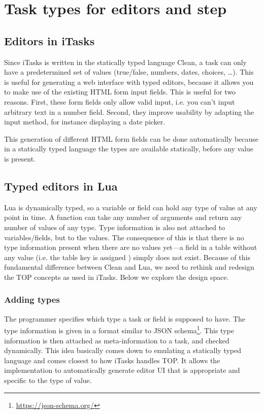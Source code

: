 \section{Task types for editors and step}\label{section-types-editors-step}


\subsection{Editors in iTasks}
Since iTasks is written in the statically typed language Clean, a task can only have a predetermined set of values (true/false, numbers, dates, choices, \dots). This is useful for generating a web interface with typed editors, because it allows you to make use of the existing HTML form input fields. This is useful for two reasons. First, these form fields only allow valid input, i.e. you can't input arbitrary text in a number field. Second, they improve usability by adapting the input method, for instance displaying a date picker.

This generation of different HTML form fields can be done automatically because in a statically typed language the types are available statically, before any value is present.

\subsection{Typed editors in Lua}\label{section-editors-lua}
Lua is dynamically typed, so a variable or field can hold any type of value at any point in time. A function can take any number of arguments and return any number of values of any type. Type information is also not attached to variables/fields, but to the values. The consequence of this is that there is no type information present when there are no values yet---a field in a table without any value (i.e. the table key is assigned ) simply does not exist.
Because of this fundamental difference between Clean and Lua, we need to rethink and redesign the TOP concepts as used in iTasks. Below we explore the design space.

\subsubsection{Adding types}
The programmer specifies which type a task or field is supposed to have. The type information is given in a format similar to JSON schema\footnote{\label{footnote-json-schema}\url{https://json-schema.org/}}. This type information is then attached as meta-information to a task, and checked dynamically. This idea basically comes down to emulating a statically typed language and comes closest to how iTasks handles TOP. It allows the implementation to automatically generate editor UI that is appropriate and specific to the type of value.

